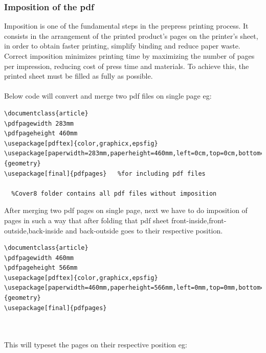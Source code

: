 \subsubsection{Imposition of the pdf}
Imposition is one of the fundamental steps in the prepress printing process. It consists in the arrangement of the printed product’s pages on the printer’s sheet, in order to obtain faster printing, simplify binding and reduce paper waste.\\
Correct imposition minimizes printing time by maximizing the number of pages per impression, reducing cost of press time and materials. To achieve this, the printed sheet must be filled as fully as possible.\\\\
Below code will convert and merge two pdf files on single page eg:
\begin{verbatim}
\documentclass{article}
\pdfpagewidth 283mm
\pdfpageheight 460mm
\usepackage[pdftex]{color,graphicx,epsfig}
\usepackage[paperwidth=283mm,paperheight=460mm,left=0cm,top=0cm,bottom=0cm,right=0cm]{geometry}
\usepackage[final]{pdfpages}   %for including pdf files 

  %Cover8 folder contains all pdf files without imposition

\end{verbatim}
After merging two pdf pages on single page, next we have to do imposition of pages in such a way that after folding that pdf sheet front-inside,front-outside,back-inside and back-outside goes to their respective position.
\begin{verbatim}
\documentclass{article}
\pdfpagewidth 460mm
\pdfpageheight 566mm
\usepackage[pdftex]{color,graphicx,epsfig}
\usepackage[paperwidth=460mm,paperheight=566mm,left=0mm,top=0mm,bottom=0mm,right=0mm]{geometry}    
\usepackage[final]{pdfpages}



\end{verbatim}
This will typeset the pages on their respective position eg:\\
\newpage
